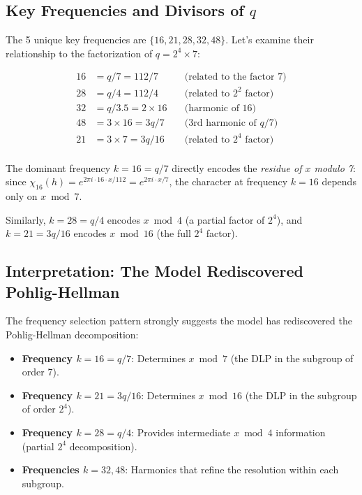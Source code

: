 \documentclass[11pt]{article}
\begin{document}
\subsection{Key Frequencies and Divisors of $q$}

The 5 unique key frequencies are $\{16, 21, 28, 32, 48\}$. Let's examine their relationship to the factorization of $q = 2^4 \times 7$:

\begin{equation}
\begin{aligned}
    16 &= q / 7 = 112 / 7 \quad &\text{(related to the factor 7)} \\
    28 &= q / 4 = 112 / 4 \quad &\text{(related to } 2^2 \text{ factor)} \\
    32 &= q / 3.5 = 2 \times 16 \quad &\text{(harmonic of 16)} \\
    48 &= 3 \times 16 = 3q/7 \quad &\text{(3rd harmonic of } q/7) \\
    21 &= 3 \times 7 = 3q/16 \quad &\text{(related to } 2^4 \text{ factor)} \\
\end{aligned}
\end{equation}

The dominant frequency $k = 16 = q/7$ directly encodes the \emph{residue of $x$ modulo 7}: since $\chi_{16}(h) = e^{2\pi i \cdot 16 \cdot x / 112} = e^{2\pi i \cdot x / 7}$, the character at frequency $k = 16$ depends only on $x \bmod 7$.

Similarly, $k = 28 = q/4$ encodes $x \bmod 4$ (a partial factor of $2^4$), and $k = 21 = 3q/16$ encodes $x \bmod 16$ (the full $2^4$ factor).

\subsection{Interpretation: The Model Rediscovered Pohlig-Hellman}

The frequency selection pattern strongly suggests the model has rediscovered the Pohlig-Hellman decomposition:
\begin{itemize}[leftmargin=*]
    \item \textbf{Frequency $k = 16 = q/7$}: Determines $x \bmod 7$ (the DLP in the subgroup of order 7).
    \item \textbf{Frequency $k = 21 = 3q/16$}: Determines $x \bmod 16$ (the DLP in the subgroup of order $2^4$).
    \item \textbf{Frequency $k = 28 = q/4$}: Provides intermediate $x \bmod 4$ information (partial $2^4$ decomposition).
    \item \textbf{Frequencies $k = 32, 48$}: Harmonics that refine the resolution within each subgroup.
\end{itemize}
\end{document}
